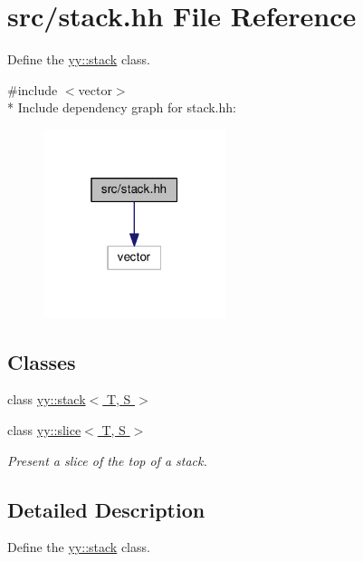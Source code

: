 \hypertarget{src_2stack_8hh}{}\section{src/stack.hh File Reference}
\label{src_2stack_8hh}


Define the \hyperlink{classyy_1_1stack}{yy\+::stack} class.  


{\ttfamily \#include $<$vector$>$}\\*
Include dependency graph for stack.\+hh\+:
\nopagebreak
\begin{figure}[H]
\begin{center}
\leavevmode
\includegraphics[width=151pt]{src_2stack_8hh__incl}
\end{center}
\end{figure}
\subsection*{Classes}
\begin{DoxyCompactItemize}
\item 
class \hyperlink{classyy_1_1stack}{yy\+::stack$<$ T, S $>$}
\item 
class \hyperlink{classyy_1_1slice}{yy\+::slice$<$ T, S $>$}
\begin{DoxyCompactList}\small\item\em Present a slice of the top of a stack. \end{DoxyCompactList}\end{DoxyCompactItemize}


\subsection{Detailed Description}
Define the \hyperlink{classyy_1_1stack}{yy\+::stack} class. 

